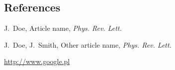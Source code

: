 \documentclass[5pt, final]{beamer}
\begin{document}
\begin{frame}[t]
\begin{multicols}{3}
			
			
			\subsection{References}
						
			\begin{thebibliography}{99}
				
				 J.~Doe, Article name, \textit{Phys. Rev. Lett.}
				
				 J.~Doe, J.~Smith, Other article name, \textit{Phys. Rev. Lett.}
				
				 \url{http://www.google.pl}
				
			\end{thebibliography}
			
		\end{multicols}
		
	\end{frame}
\end{document}
